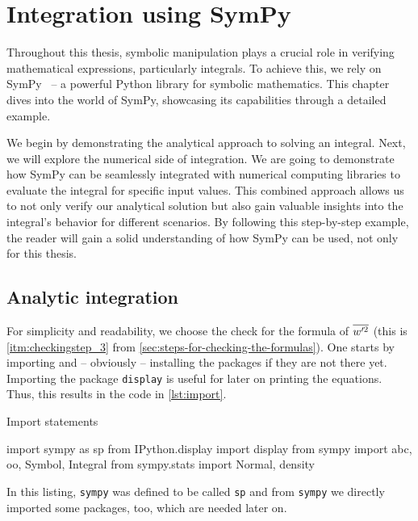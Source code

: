 \chapter{Integration using SymPy}\label{ch:integration-using-sympy}

Throughout this thesis,
symbolic manipulation plays a crucial role in verifying mathematical expressions,
particularly integrals.
To achieve this,
we rely on SymPy~\autocite{10.7717/peerj-cs.103} --
a powerful Python library for symbolic mathematics.
This chapter dives into the world of SymPy,
showcasing its capabilities through a detailed example.

We begin by demonstrating the analytical approach to solving an integral.
Next, we will explore the numerical side of integration.
We are going to demonstrate how SymPy can be seamlessly integrated with numerical computing libraries
to evaluate the integral for specific input values.
This combined approach allows us to not only verify our analytical solution
but also gain valuable insights into the integral's behavior for different scenarios.
By following this step-by-step example,
the reader will gain a solid understanding of how SymPy can be used,
not only for this thesis.


\section{Analytic integration}\label{sec:analytic-integration}

For simplicity and readability, we choose the check for the formula of $\overline{w'^2}$
(this is \cref{itm:checkingstep_3} from \cref{sec:steps-for-checking-the-formulas}).
One starts by importing and -- obviously -- installing the packages if they are not there yet.
Importing the package \texttt{display} is useful for later on printing the equations.
Thus, this results in the code in \cref{lst:import}.
\begin{listing}[!ht]
    \caption{Import statements}
    \label{lst:import}
    \begin{pythoncode}
        import sympy as sp
        from IPython.display import display
        from sympy import abc, oo, Symbol, Integral
        from sympy.stats import Normal, density
    \end{pythoncode}
\end{listing}
In this listing,
\texttt{sympy} was defined to be called \texttt{sp}
and from \texttt{sympy} we directly imported some packages,
too, which are needed later on.

